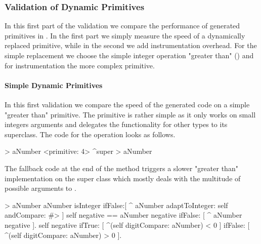 \subsubsection*{Validation of Dynamic Primitives}

In this first part of the \WF validation we compare the performance of \WF generated primitives in \PH.
In the first part we simply measure the speed of a dynamically replaced primitive, while in the second we add instrumentation overhead.
For the simple replacement we choose the simple integer operation "greater than" (\ttt{$>$}) and for instrumentation the more complex  primitive.

\paragraph{Simple Dynamic Primitives}
In this first validation we compare the speed of the \WF generated code on a simple "greater than" primitive.
The primitive is rather simple as it only works on small integers arguments and delegates the functionality for other types to its superclass.
The code for the  operation looks as follows.
%
\begin{stcode}{3}
> aNumber
	<primitive: 4>
	^super > aNumber
\end{stcode}
%
The fallback code at the end of the method triggers a slower "greater than" implementation on the super class  which mostly deals with the multitude of possible arguments to \ttt{>}.

\begin{stcode}{1}
> aNumber
	aNumber isInteger 
		ifFalse:[
			^ aNumber 
				adaptToInteger: self andCompare: #> ]
	self negative == aNumber negative
		ifFalse: [ ^ aNumber negative ].
	self negative
		ifTrue: [ ^(self digitCompare: aNumber) < 0 ]
		ifFalse: [ ^(self digitCompare: aNumber) > 0 ].
\end{stcode}


